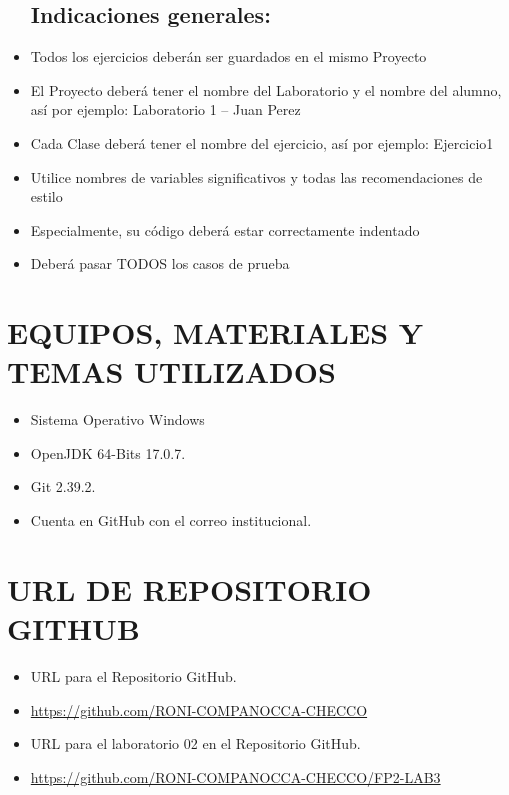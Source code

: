 \documentclass{article}
\begin{document}
\begin{itemize}
    \subsection{Indicaciones generales:}
        \item Todos los ejercicios deberán ser guardados en el mismo Proyecto
        \item El Proyecto deberá tener el nombre del Laboratorio y el nombre del alumno, así por ejemplo: Laboratorio 1 – Juan Perez
        \item Cada Clase deberá tener el nombre del ejercicio, así por ejemplo: Ejercicio1
        \item Utilice nombres de variables significativos y todas las recomendaciones de estilo
        \item Especialmente, su código deberá estar correctamente indentado
        \item Deberá pasar TODOS los casos de prueba
	\end{itemize}

    \section{EQUIPOS, MATERIALES Y TEMAS UTILIZADOS}
	\begin{itemize}
		\item Sistema Operativo Windows
		\item OpenJDK 64-Bits 17.0.7.
		\item Git 2.39.2.	
  	\item Cuenta en GitHub con el correo institucional.
	\end{itemize}

    \section{URL DE REPOSITORIO GITHUB}
	\begin{itemize}
		\item URL para el Repositorio GitHub.
		\item \url{https://github.com/RONI-COMPANOCCA-CHECCO}
		\item URL para el laboratorio 02 en el Repositorio GitHub.	
        \item \url{https://github.com/RONI-COMPANOCCA-CHECCO/FP2-LAB3}
	\end{itemize}
    
\end{document}
